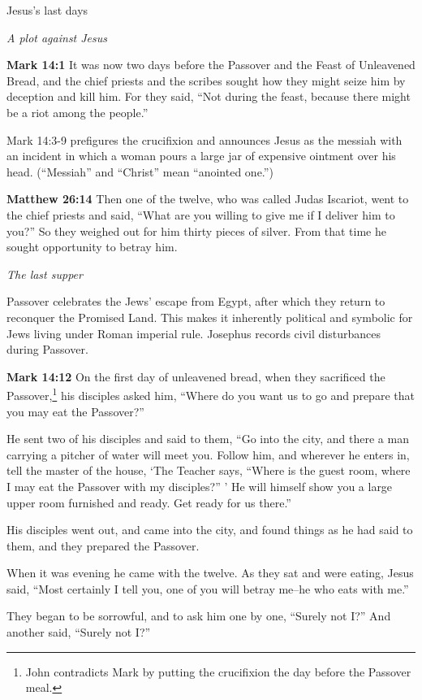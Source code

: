 \documentclass[10pt,twoside]{book}
\newcommand{\quotesize}{\normalsize{}}
\newcommand{\comm}[1]{\begingroup \color{black!50} #1\endgroup}
\newenvironment{quotetext}{\begingroup\quotesize}{\endgroup}
\newcommand{\bible}[2]{\begin{quotetext}\textbf{#1} #2\end{quotetext}}
\newcommand{\matthew}[2]{\bible{Matthew #1}{#2}}
\newcommand{\gospelmark}[2]{\bible{Mark #1}{#2}}
\newcommand{\subhead}[1]{\emph{#1}\par}
\begin{document}
\begin{section}{Jesus's last days}

\subhead{A plot against Jesus}

\gospelmark{14:1}{
It was now two days before the Passover and the Feast of Unleavened Bread, and the chief priests and the scribes sought how they might seize him by deception and kill him.   For they said, ``Not during the feast, because there might be a riot among the people.''}

\comm{Mark 14:3-9 prefigures the crucifixion and announces Jesus as the messiah with an incident in which a woman pours a large jar of
expensive ointment over his head. (``Messiah'' and ``Christ'' mean ``anointed one.'')}

\matthew{26:14}{
Then one of the twelve, who was called Judas Iscariot, went to the chief priests   and said, ``What are you willing to give me if I deliver him to you?'' So they weighed out for him thirty pieces of silver.   From that time he sought opportunity to betray him.
}

\subhead{The last supper}

\comm{Passover celebrates the Jews' escape from Egypt, after which they return to reconquer the Promised Land. This makes it
inherently political and symbolic for Jews living under Roman imperial rule. Josephus records civil disturbances during Passover.}

\gospelmark{14:12}{
  On the first day of unleavened bread, when they sacrificed the Passover,\footnote{John contradicts Mark by putting the crucifixion the day before
the Passover meal.}
his disciples asked him, ``Where do you want us to go and prepare that you may eat the Passover?''

  He sent two of his disciples and said to them, ``Go into the city, and there a man carrying a pitcher of water will meet you. Follow him,    and wherever he enters in, tell the master of the house, `The Teacher says, ``Where is the guest room, where I may eat the Passover with my disciples?'' '    He will himself show you a large upper room furnished and ready. Get ready for us there.''

  His disciples went out, and came into the city, and found things as he had said to them, and they prepared the Passover.

  When it was evening he came with the twelve.   As they sat and were eating, Jesus said, ``Most certainly I tell you, one of you will betray me--he who eats with me.''

  They began to be sorrowful, and to ask him one by one, ``Surely not I?'' And another said, ``Surely not I?''

}
\end{section}
\end{document}
